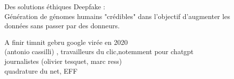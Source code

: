\begin{frame}{Des solutions éthiques}
  Deepfake :\\ 
  Génération de génomes humains "crédibles" dans l'objectif d'augmenter les données sans passer par des donneurs.
\end{frame}


\begin{frame}{A finir}
  timnit gebru google virée en 2020\\
  (antonio cassilli) , travailleurs du clic,notemment pour chatgpt \\
  journalistes (olivier tesquet, marc ress)\\
  quadrature du net, EFF\\
\end{frame}
